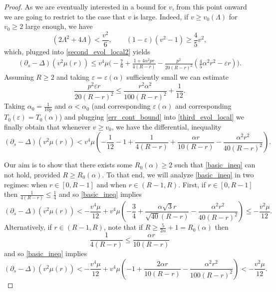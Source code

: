 \documentclass[leqno,11pt]{amsart}
\theoremstyle{definition}
\begin{document}
\begin{proof}
As we are eventually interested in a bound for $v$, from this point onward we are going to restrict to the case that $v$ is large. Indeed, if $v\geq v_0(\Lambda)$ for $v_0\geq 2$ large enough, we have
\begin{equation}\label{curv_cont_bound}
(2\Lambda^2+4\Lambda) <\frac{v^2}{6}, \qquad  (1-\varepsilon)(v^2-1) \geq \frac{4}{5}v^2,
\end{equation}
which, plugged into \eqref{second_evol_local2} yields
\begin{align}\label{third_evol_local}
(\partial_s-\Delta)(v^2\mu(r)) \leq v^4\mu\Big(-\frac{7}{6}+\frac{1+4\alpha^2pr}{4(R-r)}-\frac{p^2}{20(R-r)^2}\left(\frac{4}{5}\alpha^2r^2-\varepsilon r\right) \Big).
\end{align}
Assuming $R\geq 2$ and taking $\varepsilon=\varepsilon(\alpha)$ { sufficiently small} we can estimate
\begin{equation}\label{err_cont_bound}
\frac{p^2\varepsilon r }{20(R-r)^2} \leq \frac{r^2\alpha^2}{100(R-r)^2}+{\frac{1}{12}}.
\end{equation} 
Taking $\alpha_0=\frac{1}{10p}$ and $\alpha<\alpha_0$ (and corresponding $\varepsilon(\alpha)$ and corresponding $T_0(\varepsilon)=T_0(\alpha)$) and plugging \eqref{err_cont_bound} into \eqref{third_evol_local} we finally obtain that whenever $v\geq v_0$, we have the differential, inequality  
\begin{equation}\label{basic_ineq}
(\partial_s-\Delta)(v^2\mu(r)) < v^4\mu\left({-\frac{1}{12}}-1+\frac{1}{4(R-r)}+\frac{\alpha r}{10(R-r)}-\frac{\alpha^2r^2}{40(R-r)^2}\right).
\end{equation}

Our aim is to show that there exists some $R_0(\alpha)\geq 2$ such that \eqref{basic_ineq} can not hold, provided $R\geq  R_0(\alpha)$. To that end, we will analyze  \eqref{basic_ineq} in two regimes: when $r\in [0,R-1]$ and when $r\in (R-1,R)$.   First,  if $r\in [0,R-1]$ then  $\frac{1}{4(R-r)}\leq \frac{1}{4}$ and so \eqref{basic_ineq} implies
\begin{equation}\label{first_case_max}
(\partial_s-\Delta)(v^2\mu(r)) < {-\frac{v^4\mu}{12}} +v^4\mu\left(-\frac{3}{4}+\frac{\alpha\sqrt{3} r}{\sqrt{40}(R-r)}-\frac{\alpha^2r^2}{40(R-r)^2}\right)\leq {-\frac{v^2\mu}{12}}.
\end{equation}
{Alternatively, if} $r\in (R-1,R)$, note that if $R\geq \frac{5}{2\alpha}+1=R_0(\alpha)$ then 
\[
\frac{1}{4(R-r)} \leq \frac{\alpha r}{10(R-r)}
\]
and so \eqref{basic_ineq} implies  
\begin{equation}
(\partial_s-\Delta)(v^2\mu(r)) < {-\frac{v^4\mu}{12}}+ v^4\mu\left(-1+\frac{2\alpha r}{10 (R-r)}-\frac{\alpha^2r^2}{{100}(R-r)^2}\right)<{-\frac{v^2\mu}{12}}.
\end{equation}


\end{proof}
\end{document}
